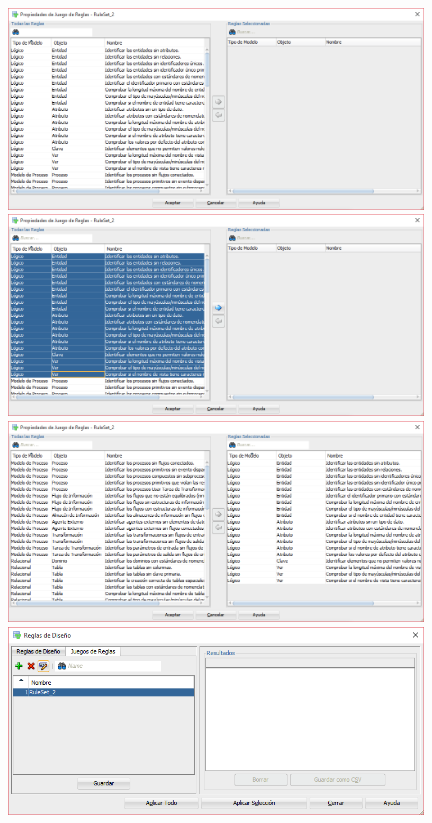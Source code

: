 \documentclass[a4paper,openright,12pt]{book}
\begin{document}
\begin{center}
\includegraphics[width=11cm]{./images/5-1 Ejercicio 3/5.png}\\
\includegraphics[width=11cm]{./images/5-1 Ejercicio 3/6.png}\\
\includegraphics[width=11cm]{./images/5-1 Ejercicio 3/7.png}\\
\includegraphics[width=11cm]{./images/5-1 Ejercicio 3/8.png}\\
\end{center}
\end{document}

